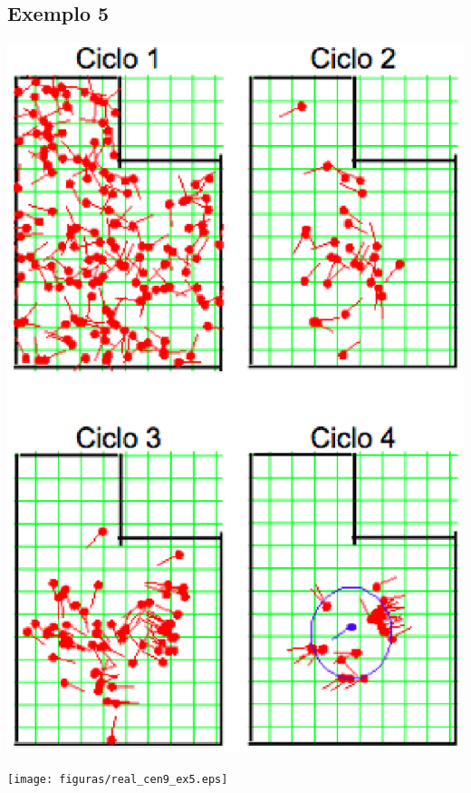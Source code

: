 \subsection{Exemplo 5}

{\centering
\includegraphics[scale=0.4]{figuras/cen9_ex5.eps}
\label{img:cen9_ex5}
\par}

{\centering
\texttt{[image: figuras/real\_cen9\_ex5.eps]}
\label{img:real_cen9_ex5}
\par}

